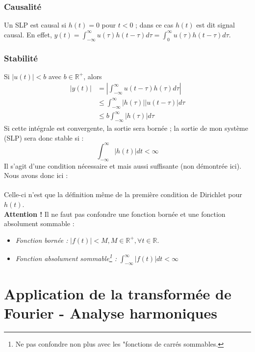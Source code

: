 		\subsubsection{Causalité}
	Un SLP est causal si $h(t) =0$ pour $t<0$ ; dans ce cas $h(t)$ est dit 
	signal causal. En effet, $y(t) = \int_{-\infty}^\infty u(\tau)h(t-\tau)d\tau = 
	\int_0^\infty u(\tau)h(t-\tau)d\tau$.
	
		\subsubsection{Stabilité}
		Si $|u(t)| < b$ avec $b\in\mathbb{R}^+$, alors 
		\begin{equation}
		\begin{array}{ll}
		|y(t)| &= |\int_{-\infty}^\infty u(t-\tau)h(\tau)d\tau|\\
		 &\leq \int_{-\infty}^\infty |h(\tau)||u(t-\tau)|d\tau\\
		 &\leq b\int_{-\infty}^\infty|h(\tau)|d\tau
		\end{array}
		\end{equation}
		Si cette intégrale est convergente, la sortie sera bornée ; la sortie de mon 
		système (SLP) sera donc stable si :
		\begin{equation}
		\int_{-\infty}^\infty |h(t)|dt < \infty
		\end{equation}
		Il s'agit d'une condition nécessaire et mais aussi suffisante (non démontrée ici).
		Nous avons donc ici :\\
		
		\ \\
		Celle-ci n'est que la définition même de la première condition de Dirichlet pour
		$h(t)$.\\
		\textbf{Attention !} Il ne faut pas confondre une fonction bornée et une fonction
		absolument sommable :
		\begin{itemize}
		\item \textit{Fonction bornée :} $|f(t)| < M, M\in \mathbb{R}^+, \forall t \in 
		\mathbb{R}$.
		\item \textit{Fonction absolument sommable\footnote{Ne pas confondre non plus avec les 
		"fonctions de carrés sommables.} :} $ \int_{-\infty}^\infty |f(t)|dt < \infty$
		\end{itemize}
		
\section{Application de la transformée de Fourier - Analyse harmoniques}

